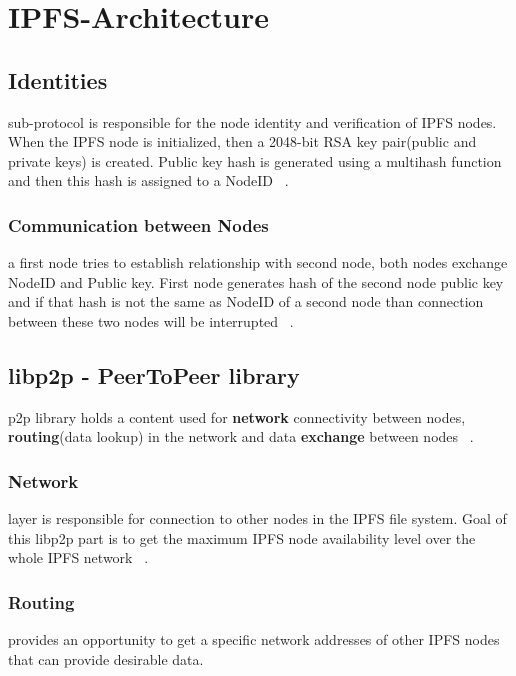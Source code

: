 \documentclass[a4paper,12pt,fleqn]{article}
\begin{document}
\section{IPFS-Architecture}

\subsection{Identities}
 sub-protocol is responsible for the node identity and verification of IPFS nodes. When the IPFS node is initialized, then a 2048-bit RSA key pair(public and private keys) is created. Public key hash is generated using a multihash function and then this hash is assigned to a NodeID ~\cite{identity}.

\subsubsection{Communication between Nodes}
 a first node tries to establish relationship with second node, both nodes exchange NodeID and Public key. First node generates hash of the second node public key and if that hash is not the same as NodeID of a second node than connection between these two nodes will be interrupted ~\cite{benet2014ipfs}.

\subsection{libp2p - PeerToPeer library}
 p2p library holds a content used for \textbf{network} connectivity between nodes, \textbf{routing}(data lookup) in the network and data \textbf{exchange} between nodes ~\cite{libp2p}.

\subsubsection{Network}

 layer is responsible for connection to other nodes in the IPFS file system. Goal of this libp2p part is to get the maximum IPFS node availability level over the whole IPFS network ~\cite{benet2014ipfs}. 

\subsubsection{Routing}

 provides an opportunity to get a specific network addresses of other IPFS nodes that can provide desirable data.
\end{document}
